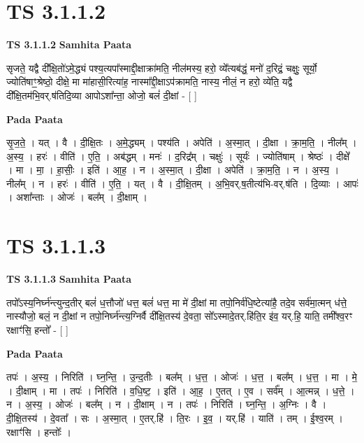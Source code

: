 \documentclass[17pt]{extarticle}
\begin{document}
\section*{ TS 3.1.1.2 }

\textbf{TS 3.1.1.2 } \newline
\textbf{Samhita Paata} \newline

सृजते॒ यद्वै दी᳚क्षि॒तो॑ऽमे॒द्ध्यं पश्य॒त्यपा᳚स्माद्दी॒क्षाक्रा॑मति॒ नील॑मस्य॒ हरो॒ व्ये᳚त्यब॑द्धं॒ मनो॑ द॒रिद्रं॒ चक्षुः॒ सूर्यो॒ ज्योति॑षाꣳ॒॒श्रेष्ठो॒ दीक्षे॒ मा मा॑हासी॒रित्या॑ह॒ नास्मा᳚द्दी॒क्षाऽप॑क्रामति॒ नास्य॒ नीलं॒ न हरो॒ व्ये॑ति॒ यद्वै दी᳚क्षि॒तम॑भि॒वर्.ष॑तिदि॒व्या आपोऽशा᳚न्ता॒ ओजो॒ बलं॑ दी॒क्षां - [  ] \newline

\textbf{Pada Paata} \newline

सृ॒ज॒ते॒ । यत् । वै । दी॒क्षि॒तः । अ॒मे॒द्ध्यम् । पश्य॑ति । अपेति॑ । अ॒स्मा॒त् । दी॒क्षा । क्रा॒म॒ति॒ । नील᳚म् । अ॒स्य॒ । हरः॑ । वीति॑ । ए॒ति॒ । अब॑द्धम् । मनः॑ । द॒रिद्र᳚म् । चक्षुः॑ । सूर्यः॑ । ज्योति॑षाम् । श्रेष्ठः॑ । दीक्षे᳚ । मा । मा॒ । हा॒सीः॒ । इति॑ । आ॒ह॒ । न । अ॒स्मा॒त् । दी॒क्षा । अपेति॑ । क्रा॒म॒ति॒ । न । अ॒स्य॒ । नील᳚म् । न । हरः॑ । वीति॑ । ए॒ति॒ । यत् । वै । दी॒क्षि॒तम् । अ॒भि॒वर्.ष॒तीत्य॑भि-वर्.ष॑ति । दि॒व्याः । आपः॑ । अशा᳚न्ताः । ओजः॑ । बल᳚म् । दी॒क्षाम् ।  \newline




\section*{ TS 3.1.1.3 }

\textbf{TS 3.1.1.3 } \newline
\textbf{Samhita Paata} \newline

तपो᳚ऽस्य॒निर्घ्न॑न्त्युन्द॒तीर् बलं॑ ध॒त्तौजो॑ धत्त॒ बलं॑ धत्त॒ मा मे॑ दी॒क्षां मा तपो॒निर्व॑धि॒ष्टेत्या॑है॒ तदे॒व सर्व॑मा॒त्मन् ध॑त्ते॒ नास्यौजो॒ बलं॒ न दी॒क्षां न तपो॒निर्घ्न॑न्त्य॒ग्निर्वै दी᳚क्षि॒तस्य॑ दे॒वता॒ सो᳚ऽस्मादे॒तर्.हि॑ति॒र इ॑व॒ यर्.हि॒ याति॒ तमी᳚श्व॒रꣳ रक्षाꣳ॑सि॒ हन्तो᳚ -  [  ] \newline

\textbf{Pada Paata} \newline

तपः॑ । अ॒स्य॒ । निरिति॑ । घ्न॒न्ति॒ । उ॒न्द॒तीः । बल᳚म् । ध॒त्त॒ । ओजः॑ । ध॒त्त॒ । बल᳚म् । ध॒त्त॒ । मा । मे॒ । दी॒क्षाम् । मा । तपः॑ । निरिति॑ । व॒धि॒ष्ट॒ । इति॑ । आ॒ह॒ । ए॒तत् । ए॒व । सर्व᳚म् । आ॒त्मन्न् । ध॒त्ते॒ । न । अ॒स्य॒ । ओजः॑ । बल᳚म् । न । दी॒क्षाम् । न । तपः॑ । निरिति॑ । घ्न॒न्ति॒ । अ॒ग्निः । वै । दी॒क्षि॒तस्य॑ । दे॒वता᳚ । सः । अ॒स्मा॒त् । ए॒तर्.हि॑ । ति॒रः । इ॒व॒ । यर्.हि॑ । याति॑ । तम् । ई॒श्व॒रम् । रक्षाꣳ॑सि । हन्तोः᳚ ।  \newline
\end{document}
